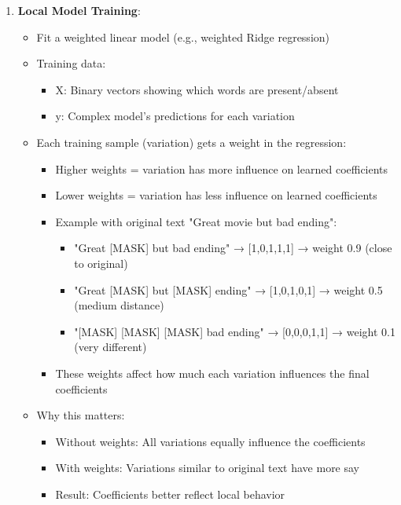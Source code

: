 \documentclass{article}
\begin{document}
\begin{enumerate}
    \item \textbf{Local Model Training}:
        \begin{itemize}
            \item Fit a weighted linear model (e.g., weighted Ridge regression)
            \item Training data:
                \begin{itemize}
                    \item X: Binary vectors showing which words are present/absent
                    \item y: Complex model's predictions for each variation
                \end{itemize}
            \item Each training sample (variation) gets a weight in the regression:
                \begin{itemize}
                    \item Higher weights = variation has more influence on learned coefficients
                    \item Lower weights = variation has less influence on learned coefficients
                    \item Example with original text "Great movie but bad ending":
                        \begin{itemize}
                            \item "Great [MASK] but bad ending" → [1,0,1,1,1] → weight 0.9 (close to original)
                            \item "Great [MASK] but [MASK] ending" → [1,0,1,0,1] → weight 0.5 (medium distance)
                            \item "[MASK] [MASK] [MASK] bad ending" → [0,0,0,1,1] → weight 0.1 (very different)
                        \end{itemize}
                    \item These weights affect how much each variation influences the final coefficients
                \end{itemize}
            \item Why this matters:
                \begin{itemize}
                    \item Without weights: All variations equally influence the coefficients
                    \item With weights: Variations similar to original text have more say
                    \item Result: Coefficients better reflect local behavior

\end{itemize}
\end{itemize}
\end{enumerate}
\end{document}
